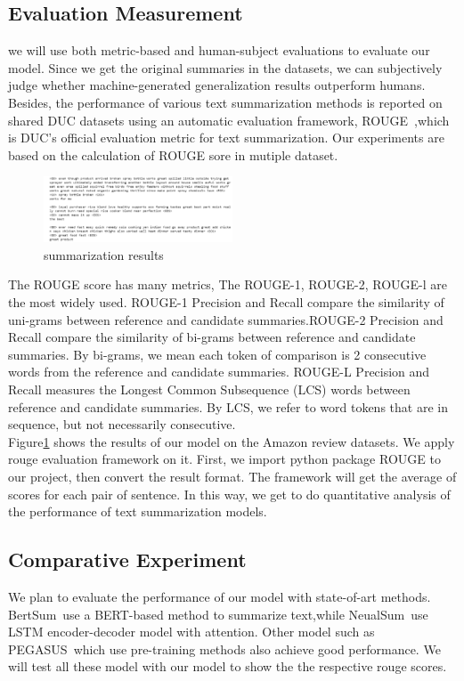 \documentclass[conference]{IEEEtran}
\begin{document}
\subsection{Evaluation Measurement}
we will use both metric-based and human-subject evaluations to evaluate our model. Since we get the original summaries in the datasets, we can subjectively judge whether machine-generated generalization results outperform humans.  Besides, the performance of various text summarization methods is reported on shared DUC datasets using an automatic evaluation framework, ROUGE~\cite{lin-2004-rouge},which is DUC’s official evaluation metric for text summarization. Our experiments are based on the calculation of ROUGE sore in mutiple dataset.

\begin{figure}[h]
\centering
\includegraphics[width=0.5\textwidth]{imgs/Results.png}
\caption{summarization results}
\label{fig:Results}
\end{figure}
The ROUGE score has many metrics, The ROUGE-1, ROUGE-2, ROUGE-l are the most widely used. ROUGE-1 Precision and Recall compare the similarity of uni-grams between reference and candidate summaries.ROUGE-2 Precision and Recall compare the similarity of bi-grams between reference and candidate summaries. By bi-grams, we mean each token of comparison is 2 consecutive words from the reference and candidate summaries. ROUGE-L Precision and Recall measures the Longest Common Subsequence (LCS) words between reference and candidate summaries. By LCS, we refer to word tokens that are in sequence, but not necessarily consecutive. \\
Figure\ref{fig:Results} shows the results of our model on the Amazon review datasets. We apply rouge evaluation framework on it. First, we import python package ROUGE to our project, then convert the result format. The framework will get the average of scores for each pair of sentence. In this way, we get to do quantitative analysis of the performance of text summarization models.\\
\subsection{Comparative Experiment}
We plan to evaluate the performance of our model with state-of-art methods. BertSum~\cite{liu2019text}use a BERT-based method to summarize text,while NeualSum~\cite{cheng2016neural}use LSTM encoder-decoder model with attention. Other model such as PEGASUS~\cite{zhang1912pegasus}which use pre-training methods also achieve good performance. We will test all these model with our model to show the 
the respective rouge scores.
\end{document}
